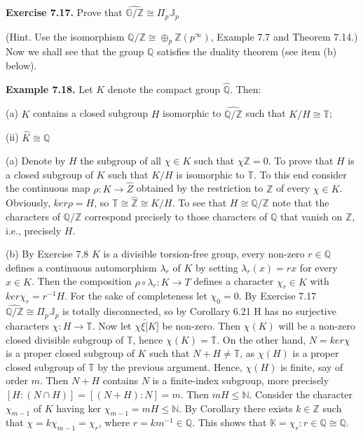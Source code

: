 \documentclass[12pt]{article}
\begin{document}
\begin{itemize}
\begin{itemize}
\begin{itemize}
\end{itemize}


\textbf{Exercise 7.17.} Prove that $\hat{\mathbb{G}/\mathbb{Z}} \cong \Pi_p \mathbb{J}_p$


(Hint. Use the isomorphism $\mathbb{Q}/\mathbb{Z} \cong \oplus_p \mathbb{Z}(p^{\infty})$, Example 7.7 and Theorem 7.14.)
Now we shall see that the group $\mathbb{Q}$ satisfies the duality theorem (see item (b) below).


\textbf{Example 7.18.} Let $K$ denote the compact group $\hat{\mathbb{Q}}$. Then: 


    (a) $K$ contains a closed subgroup $H$ isomorphic to $\hat{\mathbb{Q}/\mathbb{Z}}$ such that $K/H \cong \mathbb{T}$;

    (ii) $\hat{K} \cong \mathbb{Q}$


    (a) Denote by $H$ the subgroup of all $\chi \in K$ such that $\chi{\mathbb{Z}} = 0$. To prove that $H$ is a closed subgroup of $K$ such
that $K/H$ is isomorphic to $\mathbb{T}$. To this end consider the continuous map $\rho : K \to \hat{Z}$ obtained by the restriction
to $\mathbb{Z}$ of every $\chi \in K$. Obviously, $ker \rho = H$, so $\mathbb{T} \cong \hat{\mathbb{Z}} \cong K/H$. To see that $H \cong \hat{\mathbb{Q}/\mathbb{Z}}$ note that the characters
of $\mathbb{Q}/\mathbb{Z}$ correspond precisely to those characters of $\mathbb{Q}$ that vanish on $\mathbb{Z}$, i.e., precisely $H$.

    
    (b) By Exercise 7.8 $K$ is a divisible torsion-free group, every non-zero $r \in \mathbb{Q}$ defines a continuous automorphism
$\lambda_r$ of $K$ by setting $\lambda_r(x) = rx$ for every $x \in K$. Then the composition $\rho \circ \lambda_r : K \to T$ defines a character
$\chi_r \in \hat{K}$ with $ker \chi_r = r^{-1} H$. For the sake of completeness let $\chi_0 = 0$. By Exercise 7.17 $\hat{\mathbb{Q}/\mathbb{Z}} \cong \Pi_p \mathbb{J}_p$ is totally
disconnected, so by Corollary 6.21 H has no surjective characters $\chi : H \to \mathbb{T}$. Now let $\chi \xi \hat[K]$ be non-zero.
Then $\chi(K)$ will be a non-zero closed divisible subgroup of $\mathbb{T}$, hence $\chi(K) = \mathbb{T}$. On the other hand, $N = ker \chi$ is
a proper closed subgroup of $K$ such that $N + H \neq \mathbb{T}$, as $\chi(H)$ is a proper closed subgroup of $\mathbb{T}$ by the previous
argument. Hence, $\chi(H)$ is finite, say of order $m$. Then $N + H$ contains $N$ is a finite-index subgroup, more
precisely $[H : (N \cap H)] = [(N + H) : N] = m$. Then $mH \leq \mathbb{N}$. Consider the character $\chi_{m-1}$ of $K$ having
ker $\chi_{m-1} = mH \leq \mathbb{N}$. By Corollary there exists $k \in \mathbb{Z}$ such that $\chi = k\chi_{m-1} = \chi_r$, where $r = km^{-1} \in \mathbb{Q}$. This
shows that $\mathbb{K} = {\chi_r : r \in \mathbb{Q}} \cong \mathbb{Q}$.



\end{itemize}
\end{itemize}
\end{document}
